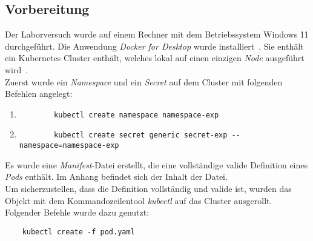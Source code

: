 \subsection{Vorbereitung}\label{subsec:preparation}
Der Laborversuch wurde auf einem Rechner mit dem Betriebssystem Windows 11 durchgeführt.
Die Anwendung \textit{Docker for Desktop} wurde installiert~\cite{docker-for-desktop-overview}. Sie enthält ein Kubernetes Cluster enthält,
welches lokal auf einen einzigen \textit{Node} ausgeführt wird~\cite{docker-for-desktop-kubernetes}.
\\
Zuerst wurde ein \textit{Namespace} und ein \textit{Secret} auf dem Cluster mit folgenden Befehlen angelegt:
\begin{enumerate}
    \item
          \begin{verbatim}
        kubectl create namespace namespace-exp
    \end{verbatim}
    \item
          \begin{verbatim}
        kubectl create secret generic secret-exp --namespace=namespace-exp
    \end{verbatim}
\end{enumerate}
Es wurde eine \textit{Manifest}-Datei erstellt, die eine vollständige valide Definition eines \textit{Pods} enthält.
Im Anhang befindet sich der Inhalt der Datei.
\\
Um sicherzustellen, dass die Definition vollständig und valide ist, wurden das Objekt mit dem Kommandozeilentool \textit{kubectl} auf das Cluster ausgerollt.
Folgender Befehle wurde dazu genutzt:

\begin{verbatim}
    kubectl create -f pod.yaml
\end{verbatim}

